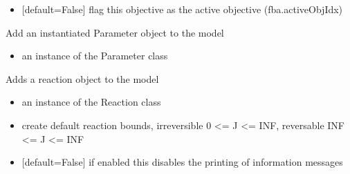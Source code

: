 \documentclass[letterpaper,10pt,english]{sphinxmanual}
\begin{document}
\begin{fulllineitems}
\begin{fulllineitems}
\begin{itemize}
\item {} 
\sphinxAtStartPar
{} {[}default=False{]} flag this objective as the active objective (fba.activeObjIdx)

\end{itemize}

\end{fulllineitems}


\begin{fulllineitems}
\label{\detokenize{modules_doc:cbmpy.CBModel.Model.addParameter}}
\pysigstartsignatures
{}
\pysigstopsignatures
\sphinxAtStartPar
Add an instantiated Parameter object to the model
\begin{itemize}
\item {} 
\sphinxAtStartPar
{} an instance of the Parameter class

\end{itemize}

\end{fulllineitems}


\begin{fulllineitems}
\label{\detokenize{modules_doc:cbmpy.CBModel.Model.addReaction}}
\pysigstartsignatures
{}
\pysigstopsignatures
\sphinxAtStartPar
Adds a reaction object to the model
\begin{itemize}
\item {} 
\sphinxAtStartPar
{} an instance of the Reaction class

\item {} 
\sphinxAtStartPar
{} create default reaction bounds, irreversible 0 \textless{}= J \textless{}= INF, reversable \sphinxhyphen{}INF \textless{}= J \textless{}= INF

\item {} 
\sphinxAtStartPar
{} {[}default=False{]} if enabled this disables the printing of information messages


\end{itemize}
\end{fulllineitems}
\end{fulllineitems}
\end{document}

